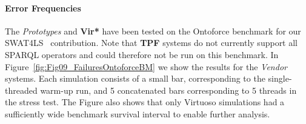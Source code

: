 \documentclass[twocolumn]{bmcart}%
\begin{document}
\paragraph{Error Frequencies}
The \emph{Prototypes} and \textbf{Vir*} have been tested on the Ontoforce benchmark for our SWAT4LS~\cite{dewitte_swat4ls_2016} contribution. Note that \textbf{TPF} systems do not currently support all SPARQL operators and could therefore not be run on this benchmark.  In Figure~\ref{fig:Fig09_FailuresOntoforceBM} we show the results for the \emph{Vendor} systems. Each simulation consists of a small bar, corresponding to the single-threaded warm-up run, and 5 concatenated bars corresponding to 5 threads in the stress test.
The Figure also shows that only Virtuoso simulations had a sufficiently wide benchmark survival interval to enable further analysis.
\end{document}
